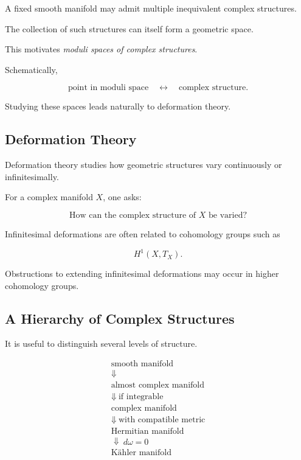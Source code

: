 A fixed smooth manifold may admit multiple inequivalent complex structures.

The collection of such structures can itself form a geometric space.

This motivates \emph{moduli spaces of complex structures}.

Schematically,

\[
\boxed{
\text{point in moduli space}
\quad\longleftrightarrow\quad
\text{complex structure}.
}
\]

Studying these spaces leads naturally to deformation theory.

\subsection{Deformation Theory}
\label{subsec:complex-deformation-theory}

Deformation theory studies how geometric structures vary continuously or
infinitesimally.

For a complex manifold \(X\), one asks:

\[
\boxed{
\text{How can the complex structure of }X\text{ be varied?}
}
\]

Infinitesimal deformations are often related to cohomology groups such as

\[
\boxed{
H^1(X,T_X).
}
\]

Obstructions to extending infinitesimal deformations may occur in higher
cohomology groups.

\subsection{A Hierarchy of Complex Structures}
\label{subsec:hierarchy-complex-structures}

It is useful to distinguish several levels of structure.

\[
\boxed{
\begin{array}{c}
\text{smooth manifold}\\
\Downarrow\\
\text{almost complex manifold}\\
\Downarrow\ \text{if integrable}\\
\text{complex manifold}\\
\Downarrow\ \text{with compatible metric}\\
\text{Hermitian manifold}\\
\Downarrow\ d\omega=0\\
\text{K\"ahler manifold}
\end{array}
}
\]

